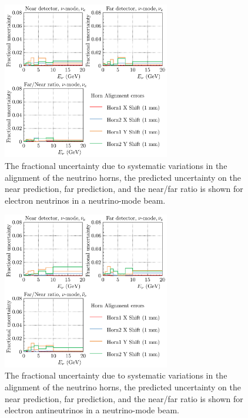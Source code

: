 \documentclass{article}
\begin{document}
\begin{figure}
  \centering
  \includegraphics[width=0.65\textwidth]{plots/fracerrs/numode_nue_HornAlignment}
  \caption{The fractional uncertainty due to systematic variations in the alignment of the neutrino horns, the predicted uncertainty on the near prediction, far prediction, and the near/far ratio is shown for electron neutrinos in a neutrino-mode beam.}
  \label{fig:hornalign_nu_nue}
\end{figure}

\begin{figure}
  \centering
  \includegraphics[width=0.65\textwidth]{plots/fracerrs/numode_nuebar_HornAlignment}
  \caption{The fractional uncertainty due to systematic variations in the alignment of the neutrino horns, the predicted uncertainty on the near prediction, far prediction, and the near/far ratio is shown for electron antineutrinos in a neutrino-mode beam.}
  \label{fig:hornalign_nu_nuebar}
\end{figure}
\end{document}
